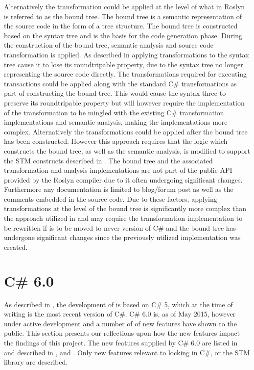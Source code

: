 Alternatively the transformation could be applied at the level of what in Roslyn is referred to as the bound tree. The bound tree is a semantic representation of the source code in the form of a tree structure. The bound tree is constructed based on the syntax tree and is the basis for the code generation phase. During the construction of the bound tree, semantic analysis and source code transformation is applied. As described in  applying transformations to the syntax tree cause it to lose its roundtripable property, due to the syntax tree no longer representing the source code directly. The transformations required for executing transactions could be applied along with the standard C\# transformations as part of constructing the bound tree. This would cause the syntax three to preserve its roundtripable property but will however require the implementation of the transformation to be mingled with the existing C\# transformation implementations and semantic analysis, making the implementations more complex. Alternatively the transformations could be applied after the bound tree has been constructed. However this approach requires that the logic which constructs the bound tree, as well as the semantic analysis, is modified to support the \ac{STM} constructs described in . The bound tree and the associated transformation and analysis implementations are not part of the public \ac{API} provided by the Roslyn compiler due to it often undergoing significant changes\cite{roslynBinder}. Furthermore any documentation is limited to blog/forum post as well as the comments embedded in the source code. Due to these factors, applying transformations at the level of the bound tree is significantly more complex than the approach utilized in  and may require the transformation implementation to be rewritten if \stmname is to be moved to never version of C\# and the bound tree has undergone significant changes since the previously utilized implementation was created.

\section{C\# 6.0}\label{sec:reflection_csharpsix}
As described in , the development of \stmname is based on C\# 5, which at the time of writing is the most recent version of C\#. C\# 6.0 is, as of May 2015, however under active development and a number of of new features have shown to the public. This section presents our reflections upon how the new features impact the findings of this project. The new features supplied by C\# 6.0 are listed in \cite{csharp6Features} and described in \cite{csharp6one}, \cite{csharp6two} and \cite{csharp6featureDescription}. Only new features relevant to locking in C\#, \stmname or the \ac{STM} library are described. 

